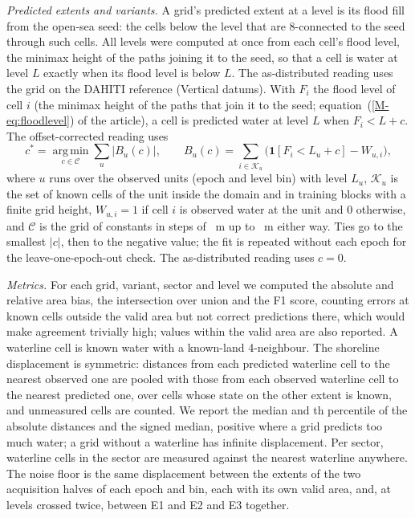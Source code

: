\emph{Predicted extents and variants.} A grid's predicted extent at a level is its flood fill from the open-sea seed: the cells below the level that are 8-connected to the seed through such cells. All levels were computed at once from each cell's flood level, the minimax height of the paths joining it to the seed, so that a cell is water at level $L$ exactly when its flood level is below $L$. The as-distributed reading uses the grid on the DAHITI reference (Vertical datums). With $F_i$ the flood level of cell $i$ (the minimax height of the paths that join it to the seed; equation~(\ref{M-eq:floodlevel}) of the article), a cell is predicted water at level $L$ when $F_i < L + c$. The offset-corrected reading uses
\begin{equation}
  c^{*} = \operatorname*{arg\,min}_{c \in \mathcal{C}} \sum_{u} \lvert B_u(c) \rvert , \qquad
  B_u(c) = \sum_{i \in \mathcal{K}_u} \Big( \mathbf{1}\!\left[ F_i < L_u + c \right] - W_{u,i} \Big) ,
  \label{eq:si_shape}
\end{equation}
where $u$ runs over the observed units (epoch and level bin) with level $L_u$, $\mathcal{K}_u$ is the set of known cells of the unit inside the domain and in training blocks with a finite grid height, $W_{u,i} = 1$ if cell $i$ is observed water at the unit and 0 otherwise, and $\mathcal{C}$ is the grid of constants in steps of ~m up to ~m either way. Ties go to the smallest $|c|$, then to the negative value; the fit is repeated without each epoch for the leave-one-epoch-out check. The as-distributed reading uses $c = 0$.

\emph{Metrics.} For each grid, variant, sector and level we computed the absolute and relative area bias, the intersection over union and the F1 score, counting errors at known cells outside the valid area but not correct predictions there, which would make agreement trivially high; values within the valid area are also reported. A waterline cell is known water with a known-land 4-neighbour. The shoreline displacement is symmetric: distances from each predicted waterline cell to the nearest observed one are pooled with those from each observed waterline cell to the nearest predicted one, over cells whose state on the other extent is known, and unmeasured cells are counted. We report the median and th percentile of the absolute distances and the signed median, positive where a grid predicts too much water; a grid without a waterline has infinite displacement. Per sector, waterline cells in the sector are measured against the nearest waterline anywhere. The noise floor is the same displacement between the extents of the two acquisition halves of each epoch and bin, each with its own valid area, and, at levels crossed twice, between E1 and E2 and E3 together.


